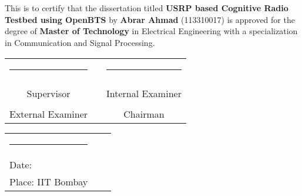 \chapter*{}

This is to certify that the dissertation titled \textbf{USRP based Cognitive
Radio Testbed using OpenBTS} by \textbf{Abrar Ahmad} (113310017) is approved
for the degree of \textbf{Master of Technology} in Electrical Engineering with
a specialization in Communication and Signal Processing.

\vspace{1.7cm}

\begin{center}
\begin{tabular}{ccc}
\rule{60mm}{0pt}        & \rule{10mm}{0pt}       & \rule{60mm}{0pt} \\
\dotfill                &                        & \dotfill \\
Supervisor              &                        & Internal Examiner \vspace{1.3cm} \\
\dotfill                &                        & \dotfill \\
External Examiner       &                        & Chairman \vspace{1.3cm} \\
\end{tabular}    
\end{center}

\vspace{1cm}

\begin{tabular}{lll}
\rule{40mm}{0pt}        & \rule{50mm}{0pt}       & \rule{60mm}{0pt} \\
Date:\dotfill           &                        & \\
Place: IIT Bombay       &                        & \\
\end{tabular}

